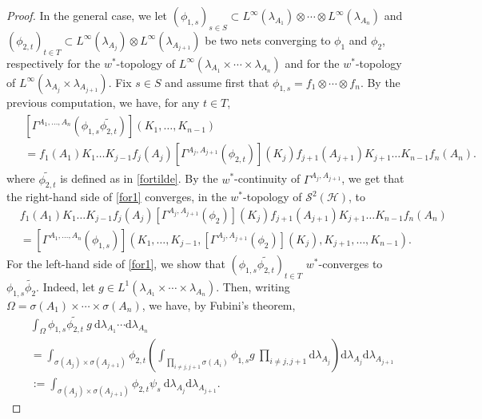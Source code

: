 \documentclass[12pt]{amsart}
\theoremstyle{remark}
\begin{document}
\begin{proof}
In the general case, we let $(\phi_{1,s})_{s\in S} \subset L^{\infty}(\lambda_{A_1}) \otimes \cdots \otimes L^{\infty}(\lambda_{A_n})$ and $(\phi_{2,t})_{t\in T} \subset L^{\infty}(\lambda_{A_j}) \otimes L^{\infty}(\lambda_{A_{j+1}})$ be two nets converging to $\phi_1$ and $\phi_2$, respectively for the $w^*$-topology of $L^{\infty}(\lambda_{A_1} \times \cdots \times \lambda_{A_n})$ and for the $w^*$-topology of $L^{\infty}(\lambda_{A_j} \times \lambda_{A_{j+1}})$. Fix $s\in S$ and assume first that $\phi_{1,s} = f_1 \otimes \cdots \otimes f_n$. By the previous computation, we have, for any $t\in T$,
\begin{align}\label{for1}
\begin{split}
& \left[ \Gamma^{A_1, \ldots, A_n}(\phi_{1,s} \widetilde{\phi_{2,t}})\right] (K_1, \ldots, K_{n-1}) \\
& = f_1(A_1)K_1 \ldots K_{j-1} f_j(A_j) \left[\Gamma^{A_j, A_{j+1}}(\phi_{2,t})\right](K_j) f_{j+1}(A_{j+1}) K_{j+1} \ldots K_{n-1}f_n(A_n).
\end{split}
\end{align}
where $\widetilde{\phi_{2,t}}$ is defined as in \eqref{fortilde}. By the $w^*$-continuity of $\Gamma^{A_j, A_{j+1}}$, we get that the right-hand side of \eqref{for1} converges, in the $w^*$-topology of $\mathcal{S}^2(\mathcal{H})$, to
\begin{align*}
& f_1(A_1)K_1 \ldots K_{j-1} f_j(A_j) \left[\Gamma^{A_j, A_{j+1}}(\phi_2)\right](K_j) f_{j+1}(A_{j+1}) K_{j+1} \ldots K_{n-1}f_n(A_n) \\
& = \left[ \Gamma^{A_1, \ldots, A_n}(\phi_{1,s})\right] \left(K_1, \ldots, K_{j-1}, \left[\Gamma^{A_j, A_{j+1}}(\phi_2)\right](K_j), K_{j+1}, \ldots, K_{n-1}\right).
\end{align*}
For the left-hand side of \eqref{for1}, we show that $(\phi_{1,s} \widetilde{\phi_{2,t}})_{t\in T}$ $w^*$-converges to $\phi_{1,s} \widetilde{\phi_2}$. Indeed, let $g\in L^1(\lambda_{A_1} \times \cdots \times \lambda_{A_n})$. Then, writing $\Omega = \sigma(A_1) \times \cdots \times \sigma(A_n)$, we have, by Fubini's theorem,
\begin{align*}
& \int_{\Omega} \phi_{1,s} \widetilde{\phi_{2,t}} ~ g \ \text{d}\lambda_{A_1} \cdots \text{d}\lambda_{A_n} \\
& = \int_{\sigma(A_j) \times \sigma(A_{j+1})} \phi_{2,t} \left( \int_{\prod_{i \neq j,j+1} \sigma(A_i)} \phi_{1,s} g \ \prod_{i \neq j,j+1}\text{d}\lambda_{A_j} \right) \text{d}\lambda_{A_j}\text{d}\lambda_{A_{j+1}} \\
& := \int_{\sigma(A_j) \times \sigma(A_{j+1})} \phi_{2,t} \psi_s \ \text{d}\lambda_{A_j}\text{d}\lambda_{A_{j+1}}.

\end{align*}
\end{proof}
\end{document}
